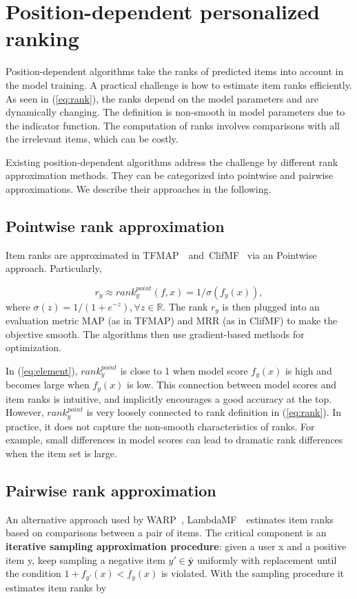 \documentclass[letterpaper]{article}
\begin{document}
\section{Position-dependent personalized ranking}


Position-dependent algorithms take the ranks of predicted items into account in the model training. A practical challenge is how to estimate item ranks efficiently. As seen in (\ref{eq:rank}), the ranks depend on the model parameters and are dynamically changing. The definition is non-smooth in model parameters due to the indicator function. The computation of ranks involves comparisons with all the irrelevant items, which can be costly.

Existing position-dependent algorithms address the challenge by different rank approximation methods. They can be categorized into pointwise and pairwise approximations. We describe their approaches in the following.

\subsection{Pointwise rank approximation}
Item ranks are approximated in TFMAP~\cite{shi2012tfmap}~and~ClifMF~\cite{shi2012climf} via an Pointwise approach. Particularly,

\begin{equation}
\label{eq:element}
r_y \approx rank^{point}_y(f,x) = 1 / \sigma (f_y(x)),
\end{equation}
where $\sigma(z) = 1 / (1 + e^{-z}), \forall z\in \mathbb{R}$. The rank $r_y$ is then plugged into an evaluation metric MAP (as in TFMAP) and MRR (as in ClifMF) to make the objective smooth. The algorithms then use gradient-based methods for optimization.

In (\ref{eq:element}), $rank^{point}_y$ is close to 1 when model score $f_y(x)$ is high and becomes large when $f_y(x)$ is low. This connection between model scores and item ranks is intuitive, and implicitly encourages a good accuracy at the top. However, $rank^{point}_y$ is very loosely connected to rank definition in (\ref{eq:rank}). In practice, it does not capture the non-smooth characteristics of ranks. For example, small differences in model scores can lead to dramatic rank differences when the item set is large.

\subsection{Pairwise rank approximation}
An alternative approach used by WARP~\cite{weston2010large}, LambdaMF~\cite{yuan2016lambdafm}~estimates item ranks based on comparisons between a pair of items. The critical component is an \textbf{iterative sampling approximation procedure}: given a user x and a positive item y, keep sampling a negative item $y'\in\bar{\textbf{y}}$ uniformly with replacement until the condition $1+f_{y'}(x)<f_y(x)$ is violated. With the sampling procedure it estimates item ranks by
\end{document}
